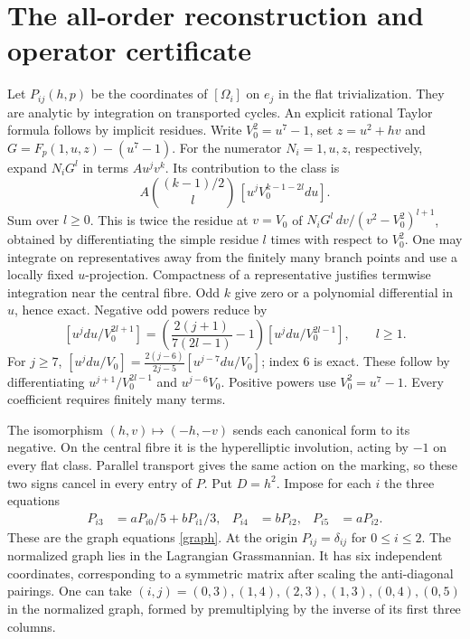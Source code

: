 \documentclass[10pt]{article}
\begin{document}
\section{The all-order reconstruction and operator certificate}
Let $P_{ij}(h,p)$ be the coordinates of $[\Omega_i]$ on $e_j$ in the flat trivialization. They are analytic by integration on transported cycles. An explicit rational Taylor formula follows by implicit residues. Write $V_0^2=u^7-1$, set $z=u^2+h v$ and $G=F_p(1,u,z)-(u^7-1)$. For the numerator $N_i=1,u,z$, respectively, expand $N_iG^l$ in terms $A u^jv^k$. Its contribution to the class is
\[
 A\binom{(k-1)/2}{l}\,[u^j V_0^{k-1-2l}du].
\]
Sum over $l\ge0$. This is twice the residue at $v=V_0$ of $N_iG^l\,dv/(v^2-V_0^2)^{l+1}$, obtained by differentiating the simple residue $l$ times with respect to $V_0^2$. One may integrate on representatives away from the finitely many branch points and use a locally fixed $u$-projection. Compactness of a representative justifies termwise integration near the central fibre. Odd $k$ give zero or a polynomial differential in $u$, hence exact. Negative odd powers reduce by
\[
 [u^jdu/V_0^{2l+1}]=\left(\frac{2(j+1)}{7(2l-1)}-1\right)[u^jdu/V_0^{2l-1}],\qquad l\ge1.
\]
For $j\ge7$, $[u^jdu/V_0]=\frac{2(j-6)}{2j-5}[u^{j-7}du/V_0]$; index $6$ is exact. These follow by differentiating $u^{j+1}/V_0^{2l-1}$ and $u^{j-6}V_0$. Positive powers use $V_0^2=u^7-1$. Every coefficient requires finitely many terms.

The isomorphism $(h,v)\mapsto(-h,-v)$ sends each canonical form to its negative. On the central fibre it is the hyperelliptic involution, acting by $-1$ on every flat class. Parallel transport gives the same action on the marking, so these two signs cancel in every entry of $P$. Put $D=h^2$. Impose for each $i$ the three equations
\begin{align*}
 P_{i3}&=a P_{i0}/5+b P_{i1}/3,& P_{i4}&=bP_{i2},&P_{i5}&=aP_{i2}.
\end{align*}
These are the graph equations \eqref{graph}. At the origin $P_{i j}=\delta_{ij}$ for $0\le i\le2$. The normalized graph lies in the Lagrangian Grassmannian. It has six independent coordinates, corresponding to a symmetric matrix after scaling the anti-diagonal pairings. One can take $(i,j)=(0,3),(1,4),(2,3),(1,3),(0,4),(0,5)$ in the normalized graph, formed by premultiplying by the inverse of its first three columns.
\end{document}
